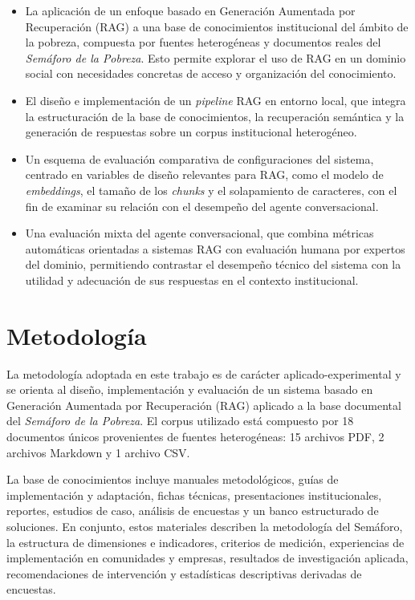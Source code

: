 \documentclass{article}
\begin{document}
\begin{itemize}

\item La aplicación de un enfoque basado en Generación Aumentada por Recuperación (RAG) a una base de conocimientos institucional del ámbito de la pobreza, compuesta por fuentes heterogéneas y documentos reales del \textit{Semáforo de la Pobreza}. Esto permite explorar el uso de RAG en un dominio social con necesidades concretas de acceso y organización del conocimiento.

\item El diseño e implementación de un \textit{pipeline} RAG en entorno local, que integra la estructuración de la base de conocimientos, la recuperación semántica y la generación de respuestas sobre un corpus institucional heterogéneo.

\item Un esquema de evaluación comparativa de configuraciones del sistema, centrado en variables de diseño relevantes para RAG, como el modelo de \textit{embeddings}, el tamaño de los \textit{chunks} y el solapamiento de caracteres, con el fin de examinar su relación con el desempeño del agente conversacional.

\item Una evaluación mixta del agente conversacional, que combina métricas automáticas orientadas a sistemas RAG con evaluación humana por expertos del dominio, permitiendo contrastar el desempeño técnico del sistema con la utilidad y adecuación de sus respuestas en el contexto institucional.

\end{itemize}

\section{Metodología}\label{sec:metodologia}

La metodología adoptada en este trabajo es de carácter aplicado-experimental y se orienta al diseño, implementación y evaluación de un sistema basado en Generación Aumentada por Recuperación (RAG) aplicado a la base documental del \textit{Semáforo de la Pobreza}. El corpus utilizado está compuesto por 18 documentos únicos provenientes de fuentes heterogéneas: 15 archivos PDF, 2 archivos Markdown y 1 archivo CSV.

La base de conocimientos incluye manuales metodológicos, guías de implementación y adaptación, fichas técnicas, presentaciones institucionales, reportes, estudios de caso, análisis de encuestas y un banco estructurado de soluciones. En conjunto, estos materiales describen la metodología del Semáforo, la estructura de dimensiones e indicadores, criterios de medición, experiencias de implementación en comunidades y empresas, resultados de investigación aplicada, recomendaciones de intervención y estadísticas descriptivas derivadas de encuestas.
\end{document}
